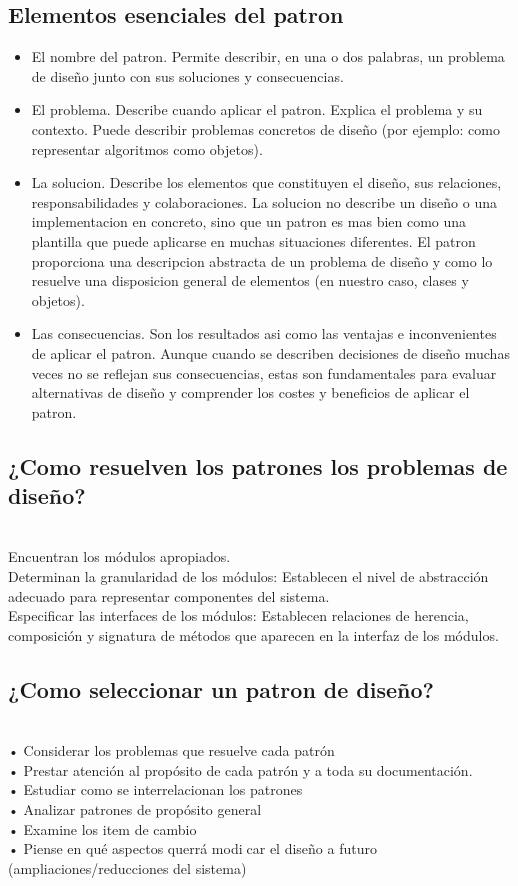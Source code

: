 \documentclass[twoside,twocolumn]{article}
\begin{document}
\subsection{Elementos esenciales del patron}

\begin{itemize}
\item El nombre del patron.
Permite describir, en una o dos palabras, un problema de diseño junto con sus soluciones y consecuencias.
\item El problema.
Describe cuando aplicar el patron. Explica el problema y su contexto. Puede describir problemas concretos de diseño (por ejemplo: como representar algoritmos como objetos).
\item La solucion.
Describe los elementos que constituyen el diseño, sus relaciones, responsabilidades y colaboraciones. La solucion no describe un diseño o una implementacion en concreto, sino que un patron es mas bien como una plantilla que puede aplicarse en muchas situaciones diferentes. El patron proporciona una descripcion abstracta de un problema de diseño y como lo resuelve una disposicion general de elementos (en nuestro caso, clases y objetos).
\item Las consecuencias.
Son los resultados asi como las ventajas e inconvenientes de aplicar el patron. Aunque cuando se describen decisiones de diseño muchas veces no se reflejan sus consecuencias, estas son fundamentales para evaluar alternativas de diseño y comprender los costes y beneficios de aplicar el patron.
\end{itemize} 
\subsection{¿Como resuelven los patrones los problemas de diseño?}
\\Encuentran los módulos apropiados.
\\Determinan la granularidad de los módulos: Establecen el nivel de abstracción adecuado para representar componentes del sistema.
\\Especificar las interfaces de los módulos: Establecen relaciones de herencia, composición y signatura de métodos que aparecen en la interfaz de los módulos.
\subsection{¿Como seleccionar un patron de diseño?}
\\• Considerar los problemas que resuelve cada patrón
\\• Prestar atención al propósito de cada patrón y a toda su documentación.
\\• Estudiar como se interrelacionan los patrones
\\• Analizar patrones de propósito general
\\• Examine los item de cambio
\\• Piense en qué aspectos querrá modicar el diseño a futuro (ampliaciones/reducciones del sistema)
\end{document}
